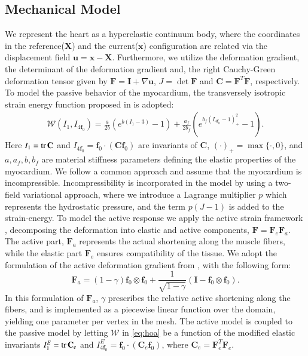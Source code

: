 \documentclass[times]{elsarticle}
\newcommand{\tr}{\mathrm{tr} \hspace{0.05cm} }
\newcommand{\Xvec}{\mathbf{X}}
\newcommand{\xvec}{\mathbf{x}}
\newcommand{\uvec}{\mathbf{u}}
\newcommand{\ef}{\mathbf{f}_0}
\newcommand{\C}{\mathbf{C}}
\newcommand{\F}{\mathbf{F}}
\newcommand{\I}{\mathbf{I}}
\begin{document}
\subsection{Mechanical Model}
We represent the heart as a hyperelastic continuum body, where the coordinates in
the reference($\Xvec$) and the current($\xvec$) configuration are
related via the displacement field $\uvec = \xvec-\Xvec$. Furthermore,
we utilize the
deformation gradient, the determinant of the deformation gradient
and, the right Cauchy-Green deformation tensor given by $\F= \I+\nabla
\uvec $,  $J = \det \F$ and $\C = \F^T\F$, respectively. 
To model the passive behavior of the myocardium, the transversely 
isotropic strain energy function proposed in  \cite{holzapfel2009constitutive} is adopted:
\begin{align}
\label{eq:hoa}
  \mathcal{W}(I_1, I_{4\ef}) = \frac{a}{2 b} \left( e^{ b (I_1 
  - 3)}  -1 \right)
  + \frac{a_f}{2 b_f} \left( e^{ b_f (I_{4\ef} 
  - 1)_+^2} -1 \right).
\end{align}
Here $I_1 = \tr \C$ and $I_{4\ef}= \ef \cdot (\C \ef)$ are invariants
of $\C$, $(\cdotp)_{+}  = \max\{\cdot, 0\}$, and $a, a_f, b, b_f$ are
material stiffness parameters defining the elastic properties of the myocardium.
We follow a common approach and assume that the myocardium is incompressible. 
Incompressibility is incorporated in the model by using a two-field variational 
approach, where we introduce a Lagrange multiplier $p$ which represents the 
hydrostatic pressure, and the term $p(J-1)$ is added to the strain-energy.
To model the active response we apply the active strain framework
\cite{ambrosi2011electromechanical}, decomposing the deformation into
elastic and active components, $\F = \F_e \F_a$. The active part,
$\F_a$ represents the actual shortening along the muscle fibers, while
the elastic part $\F_e$ ensures compatibility of the tissue. We adopt
the formulation of the active deformation gradient from
\cite{gjerald2014patient}, with the following form:  
\begin{equation}
  \F_a =
  (1 - \gamma) \ef \otimes \ef
  + \frac{1}{\sqrt{1 - \gamma}} (\I - \ef \otimes \ef).
 \label{eq:active_strain_Fa_gjerald}
\end{equation}
In this formulation of $\F_a$, $\gamma$ prescribes the relative active shortening
along the fibers, and is implemented as a piecewise linear function over
the domain, yielding one parameter per vertex in the mesh. The active
model is coupled to the passive model by letting
$\mathcal{W}$ in \eqref{eq:hoa} be a function of the
modified elastic invariants $I_1^E = \tr \C_e$ and $I_{4\ef}^E = \ef
\cdot (\C_e \ef)$, where $\C_e = \F_e^T\F_e$.
\end{document}
